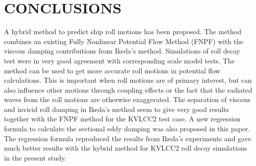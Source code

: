 \section*{CONCLUSIONS}\label{conclusions}
A hybrid method to predict ship roll motions has been proposed. The
method combines an existing Fully Nonlinear Potential Flow Method (FNPF)
with the viscous damping contributions from Ikeda's method. Simulations
of roll decay test were in very good agreement with corresponding scale
model tests. The method can be used to get more accurate roll motions in
potential flow calculations. This is important when roll motions are of
primary interest, but can also influence other motions through coupling
effects or the fact that the radiated waves from the roll motions are
otherwise exaggerated. The separation of viscous and invicid roll
damping in Ikeda's method seem to give very good results together with
the FNPF method for the KVLCC2 test case.
\quad A new regression formula to calculate the sectional eddy damping
was also proposed in this paper. The regression formula reproduced the
results from Ikeda's experiments and gave much better results with the
hybrid method for KVLCC2 roll decay simulations in the present study.
